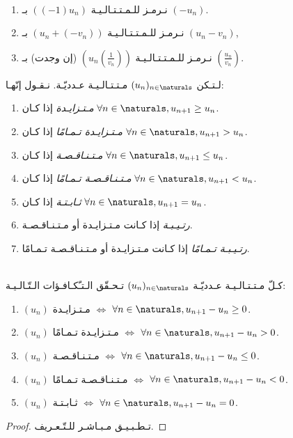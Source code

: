 \begin{remark}\ \\%
    \begin{enumerate}
        \item نـرمـز للـمـتـتـالـيـة \(\left((-1)u_n\right)\) بـ \((-u_n)\).
        \item نـرمـز للـمـتـتـالـيـة \((u_n + (-v_n))\) بـ \((u_n - v_n)\),
        \item نـرمـز للـمـتـتـالـيـة \(\left(u_n\left(\frac{1}{v_n}\right)\right)\) (إن وجدت)
              بـ \(\left(\frac{u_n}{v_n}\right)\).
    \end{enumerate}
\end{remark}

\begin{definition}%
    \label{def:sequences:monotony-and-variations}
    لـتـكن \((u_n)_{n \in \naturals}\) مـتـتـالـيـة عـدديّـة. نـقـول إنّهـا:
    \begin{enumerate}
        \item \emph{مـتـزايـدة} إذا كـان \(\forall n \in \naturals, u_{n+1} \ge u_n\).
        \item \emph{مـتـزايـدة تـمـامًا} إذا كـان \(\forall n \in \naturals, u_{n+1} > u_n\).
        \item \emph{مـتـنـاقـصـة} إذا كـان \(\forall n \in \naturals, u_{n+1} \le u_n\).
        \item \emph{مـتـنـاقـصـة تـمـامًا} إذا كـان \(\forall n \in \naturals, u_{n+1} < u_n\).
        \item \emph{ثـابـتـة} إذا كـان \(\forall n \in \naturals, u_{n+1} = u_n\).
        \item \emph{رتـيـبـة} إذا كـانت مـتـزايـدة أو مـتـنـاقـصـة.
        \item \emph{رتـيـبـة تـمـامًا} إذا كـانت مـتـزايـدة أو مـتـنـاقـصـة تـمـامًا.
    \end{enumerate}
\end{definition}

\begin{theorem}%
    \label{thm:sequences:variations}\ \\%
    كـلّ مـتـتـالـيـة عـدديّـة \((u_n)_{n \in \naturals}\) تـحـقّق الـتـّكـافـؤات الـتّـالـيـة:
    \begin{enumerate}
        \item \((u_n)\) مـتـزايـدة  \(\iff\) \(\forall n \in \naturals, u_{n+1} - u_n \ge 0 \).
        \item \((u_n)\) مـتـزايـدة تـمـامًا \(\iff\) \(\forall n \in \naturals, u_{n+1} - u_n > 0 \).
        \item \((u_n)\) مـتـنـاقـصـة \(\iff\) \(\forall n \in \naturals, u_{n+1} - u_n \le 0 \).
        \item \((u_n)\) مـتـنـاقـصـة تـمـامًا \(\iff\) \(\forall n \in \naturals, u_{n+1} - u_n < 0 \).
        \item \((u_n)\) ثـابـتـة \(\iff\) \(\forall n \in \naturals, u_{n+1} - u_n = 0 \).
    \end{enumerate}
\end{theorem}
\begin{proof}%
    تـطـبـيـق مـبـاشـر للـتّـعـريف.
\end{proof}
